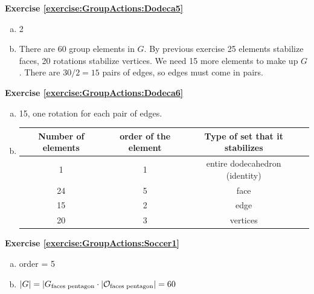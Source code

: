 \noindent\textbf{Exercise \ref{exercise:GroupActions:Dodeca5}}
\begin{enumerate}[(a)]
\item
2

\item 
There are 60 group elements in $G$.  By previous exercise 25 elements stabilize faces, 20 rotations stabilize vertices. We need 15 more elements to make up $G$.  There are $30/2=15$ pairs of edges, so edges must come in pairs.
\end{enumerate}

\noindent\textbf{Exercise \ref{exercise:GroupActions:Dodeca6}}
\begin{enumerate}[(a)]
\item
15, one rotation for each pair of edges.

\item
\begin{tabular}{| c |c|c| r |}\hline
Number of elements & order of the element & Type of set that it stabilizes \\ \hline
1 & 1 & entire dodecahedron (identity) \\ \hline
24 & 5 & face \\ \hline
15 & 2 & edge\\ \hline
20 & 3  & vertices\\ \hline
\end{tabular}
\end{enumerate}

\noindent\textbf{Exercise \ref{exercise:GroupActions:Soccer1}}
\begin{enumerate}[(a)]
\item
order = 5
\item
$|G| = |G_{\text{faces pentagon}} \cdot |{\cal O}_{\text{faces pentagon}}| = 60$
\end{enumerate}

